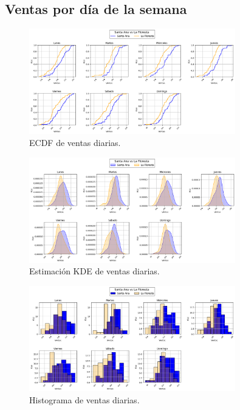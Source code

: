 \documentclass[12pt,a4paper]{article}
\begin{document}
\subsection{Ventas por día de la semana}
\begin{figure}[H]
  \centering
  \includegraphics[width=0.8\textwidth]{graphs/dias_fde.png}
  \caption{ECDF de ventas diarias.}
  \label{fig:ecdf_dias}
\end{figure}
\begin{figure}[H]
  \centering
  \includegraphics[width=0.8\textwidth]{graphs/dias_kde.png}
  \caption{Estimación KDE de ventas diarias.}
  \label{fig:kde_dias}
\end{figure}
\begin{figure}[H]
  \centering
  \includegraphics[width=0.8\textwidth]{graphs/dias_histo.png}
  \caption{Histograma de ventas diarias.}
  \label{fig:histo_dias}
\end{figure}
\end{document}
